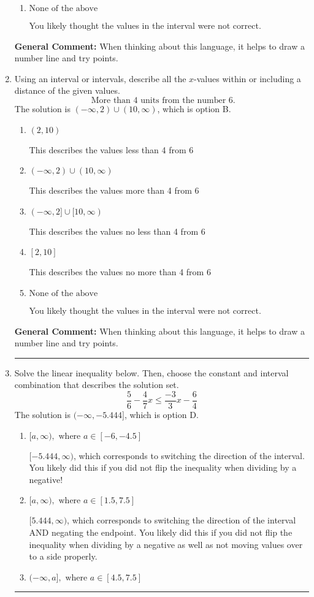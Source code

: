 \documentclass{extbook}[14pt]
\newcommand{\litem}[1]{\item #1

\rule{\textwidth}{0.4pt}}
\begin{document}
\begin{enumerate}
{\begin{enumerate}[label=\Alph*.]
This describes the values more than 7 from 4
\item \( \text{None of the above} \)

You likely thought the values in the interval were not correct.
\end{enumerate}

\textbf{General Comment:} When thinking about this language, it helps to draw a number line and try points.
}
\litem{
Using an interval or intervals, describe all the $x$-values within or including a distance of the given values.
\[ \text{ More than } 4 \text{ units from the number } 6. \]The solution is \( (-\infty, 2) \cup (10, \infty) \), which is option B.\begin{enumerate}[label=\Alph*.]
\item \( (2, 10) \)

This describes the values less than 4 from 6
\item \( (-\infty, 2) \cup (10, \infty) \)

This describes the values more than 4 from 6
\item \( (-\infty, 2] \cup [10, \infty) \)

This describes the values no less than 4 from 6
\item \( [2, 10] \)

This describes the values no more than 4 from 6
\item \( \text{None of the above} \)

You likely thought the values in the interval were not correct.
\end{enumerate}

\textbf{General Comment:} When thinking about this language, it helps to draw a number line and try points.
}
\litem{
Solve the linear inequality below. Then, choose the constant and interval combination that describes the solution set.
\[ \frac{5}{6} - \frac{4}{7} x \leq \frac{-3}{3} x - \frac{6}{4} \]The solution is \( (-\infty, -5.444] \), which is option D.\begin{enumerate}[label=\Alph*.]
\item \( [a, \infty), \text{ where } a \in [-6, -4.5] \)

 $[-5.444, \infty)$, which corresponds to switching the direction of the interval. You likely did this if you did not flip the inequality when dividing by a negative!
\item \( [a, \infty), \text{ where } a \in [1.5, 7.5] \)

 $[5.444, \infty)$, which corresponds to switching the direction of the interval AND negating the endpoint. You likely did this if you did not flip the inequality when dividing by a negative as well as not moving values over to a side properly.
\item \( (-\infty, a], \text{ where } a \in [4.5, 7.5] \)


\end{enumerate}}
\end{enumerate}
\end{document}
